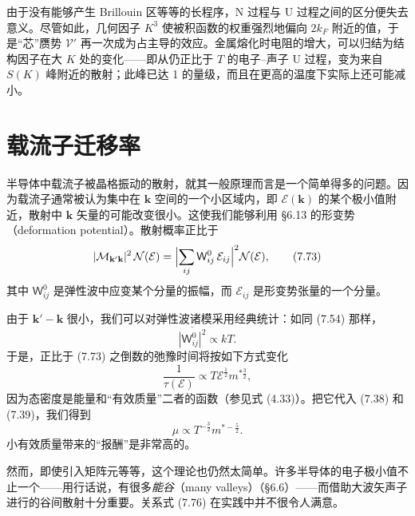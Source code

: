 
由于没有能够产生 Brillouin 区等等的长程序，N 过程与 U 过程之间的区分便失去意义。尽管如此，几何因子 $K^{3}$ 使被积函数的权重强烈地偏向 $2k_{F}$ 附近的值，于是“芯”赝势 $\mathcal{V}'$ 再一次成为占主导的效应。金属熔化时电阻的增大，可以归结为结构因子在大 $K$ 处的变化——即从仍正比于 $T$ 的电子--声子 U 过程，变为来自 $S(K)$ 峰附近的散射；此峰已达 1 的量级，而且在更高的温度下实际上还可能减小。

\section{载流子迁移率}

半导体中载流子被晶格振动的散射，就其一般原理而言是一个简单得多的问题。因为载流子通常被认为集中在 $\mathbf{k}$ 空间的一个小区域内，即 $\mathcal{E}(\mathbf{k})$ 的某个极小值附近，散射中 $\mathbf{k}$ 矢量的可能改变很小。这使我们能够利用 §6.13 的形变势（deformation potential）。散射概率正比于
\begin{equation*}
|\mathcal{M}_{\mathbf{k}'\mathbf{k}}|^{2}\,\mathcal{N}(\mathcal{E})=\Bigl|\sum_{ij}\mathsf{W}^{0}_{ij}\,\mathcal{E}_{ij}\Bigr|^{2}\mathcal{N}(\mathcal{E}),\tag{7.73}
\end{equation*}
其中 $\mathsf{W}^{0}_{ij}$ 是弹性波中应变某个分量的振幅，而 $\mathcal{E}_{ij}$ 是形变势张量的一个分量。

由于 $\mathbf{k}'-\mathbf{k}$ 很小，我们可以对弹性波诸模采用经典统计：如同 (7.54) 那样，
\begin{equation*}
\overline{|\mathsf{W}^{0}_{ij}|^{2}}\propto kT.\tag{7.74}
\end{equation*}
于是，正比于 (7.73) 之倒数的弛豫时间将按如下方式变化
\begin{equation*}
\frac{1}{\tau(\mathcal{E})}\propto T\mathcal{E}^{\frac{1}{2}}m^{*\frac{3}{2}},\tag{7.75}
\end{equation*}
因为态密度是能量和“有效质量”二者的函数（参见式 (4.33)）。把它代入 (7.38) 和 (7.39)，我们得到
\begin{equation*}
\mu\propto T^{-\frac{3}{2}}m^{*-\frac{5}{2}}.\tag{7.76}
\end{equation*}
小有效质量带来的“报酬”是非常高的。

然而，即使引入矩阵元等等，这个理论也仍然太简单。许多半导体的电子极小值不止一个——用行话说，有很多\emph{能谷}（many valleys）（§6.6）——而借助大波矢声子进行的谷间散射十分重要。关系式 (7.76) 在实践中并不很令人满意。

